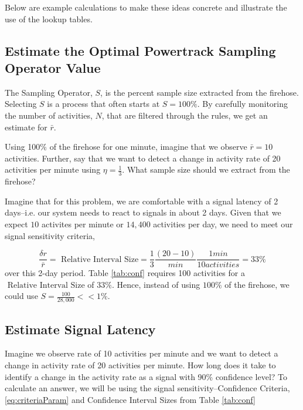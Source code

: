 \documentclass{article}
\begin{document}
Below are example calculations to make these ideas concrete and illustrate the use of the lookup tables.

\subsection{Estimate the Optimal Powertrack Sampling Operator Value} 

The Sampling Operator, $S$, is the percent sample size extracted from the firehose.  Selecting $S$ is a process 
that often starts at $S =100\%$.  By carefully monitoring the number of activities, $N$, that are filtered through
the rules, we get an estimate for $\bar{r}$.

Using 100\% of the firehose for one minute, imagine that we observe $\bar{r}=10$ activities.  Further, say that 
we want to detect a change in activity rate of 20 activities per minute using $\eta = \frac{1}{3}$.  What sample
size should we extract from the firehose?  

Imagine that for this problem, we are comfortable with a signal latency of 2 days--i.e. our system needs to 
react to signals in about 2 days.  Given that we expect $10$ activites per minute or $14,400$ activities per day, 
we need to meet our signal sensitivity criteria,

\begin{equation}
\label{eq:ex1:criteria}
\frac{\delta r}{\bar{r}} = \text{ Relative Interval Size} = \frac{1}{3}\frac{(20-10)}{min} \frac{1 min}{10 activities}= 33\% 
\end{equation}
over this 2-day period.  Table \ref{tab:conf} requires 100 activities for a $\text{ Relative Interval Size}$ of $33\%$. Hence, 
instead of using $100\%$ of the firehose, we could use $S = \frac{100}{28,000} << 1\%$.
   
\subsection{Estimate Signal Latency} 


Imagine we observe rate of 10 activities per minute and we want to detect a change in activity rate of 20 activities
per minute.  How long does it take to identify a change in the activity rate as a signal with 90\% confidence level? 
To calculate an answer, we will be using the signal sensitivity--Confidence Criteria, \ref{eq:criteriaParam} and 
Confidence Interval Sizes from Table \ref{tab:conf}
\end{document}
